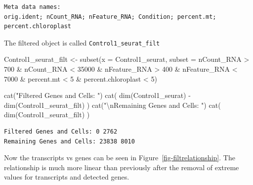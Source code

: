 \documentclass[
  letterpaper,
  DIV=11,
  numbers=noendperiod]{scrartcl}
\newenvironment{Shaded}{\begin{snugshade}}{\end{snugshade}}
\newcommand{\AttributeTok}[1]{\textcolor[rgb]{0.49,0.56,0.16}{#1}}
\newcommand{\DecValTok}[1]{\textcolor[rgb]{0.25,0.63,0.44}{#1}}
\newcommand{\FunctionTok}[1]{\textcolor[rgb]{0.02,0.16,0.49}{#1}}
\newcommand{\NormalTok}[1]{\textcolor[rgb]{0.00,0.44,0.13}{#1}}
\newcommand{\OtherTok}[1]{\textcolor[rgb]{0.00,0.44,0.13}{#1}}
\newcommand{\SpecialCharTok}[1]{\textcolor[rgb]{0.25,0.44,0.63}{#1}}
\newcommand{\StringTok}[1]{\textcolor[rgb]{0.25,0.44,0.63}{#1}}
\begin{document}
\begin{verbatim}
Meta data names:
orig.ident; nCount_RNA; nFeature_RNA; Condition; percent.mt; percent.chloroplast
\end{verbatim}

The filtered object is called \texttt{Control1\_seurat\_filt}

\begin{Shaded}
\begin{Highlighting}[]
\NormalTok{Control1\_seurat\_filt }\OtherTok{\textless{}{-}} \FunctionTok{subset}\NormalTok{(}\AttributeTok{x =}\NormalTok{ Control1\_seurat, }
                                        \AttributeTok{subset =}\NormalTok{ nCount\_RNA }\SpecialCharTok{\textgreater{}} \DecValTok{700} \SpecialCharTok{\&}
\NormalTok{                                                 nCount\_RNA }\SpecialCharTok{\textless{}} \DecValTok{35000} \SpecialCharTok{\&}
\NormalTok{                                                 nFeature\_RNA }\SpecialCharTok{\textgreater{}} \DecValTok{400} \SpecialCharTok{\&} 
\NormalTok{                                                 nFeature\_RNA }\SpecialCharTok{\textless{}} \DecValTok{7000} \SpecialCharTok{\&} 
\NormalTok{                                                 percent.mt }\SpecialCharTok{\textless{}} \DecValTok{5} \SpecialCharTok{\&} 
\NormalTok{                                                 percent.chloroplast }\SpecialCharTok{\textless{}} \DecValTok{5}\NormalTok{)}

\FunctionTok{cat}\NormalTok{(}\StringTok{"Filtered Genes and Cells: "}\NormalTok{)}
\FunctionTok{cat}\NormalTok{( }\FunctionTok{dim}\NormalTok{(Control1\_seurat) }\SpecialCharTok{{-}} \FunctionTok{dim}\NormalTok{(Control1\_seurat\_filt) )}
\FunctionTok{cat}\NormalTok{(}\StringTok{"}\SpecialCharTok{\textbackslash{}n}\StringTok{Remaining Genes and Cells: "}\NormalTok{)}
\FunctionTok{cat}\NormalTok{( }\FunctionTok{dim}\NormalTok{(Control1\_seurat\_filt) )}
\end{Highlighting}
\end{Shaded}

\begin{verbatim}
Filtered Genes and Cells: 0 2762
Remaining Genes and Cells: 23838 8010
\end{verbatim}

Now the transcripts vs genes can be seen in
Figure~\ref{fig-filtrelationship}. The relationship is much more linear
than previously after the removal of extreme values for transcripts and
detected genes.
\end{document}
